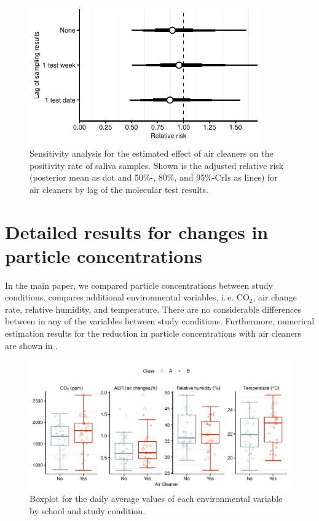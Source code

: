 \documentclass[fleqn,11pt]{wlscirep_supp}
\newcommand\ie{i.\,e.\xspace}
\begin{document}
\begin{figure}[!htb]
\centering
    \includegraphics[width=10cm]{../../results/mol-data/model-results.pdf}
    \caption[Sensitivity analysis for the estimated effect of air cleaners on the positivity rate of saliva samples]{Sensitivity analysis for the estimated effect of air cleaners on the positivity rate of saliva samples. Shown is the adjusted relative risk (posterior mean as dot and 50\%-, 80\%, and 95\%-CrIs as lines) for air cleaners by lag of the molecular test results.}
    \label{fig:mol-estimation-results-sensitivity}
\end{figure}

\clearpage

\section{Detailed results for changes in particle concentrations}\label{sec:detailed-palas}

In the main paper, we compared particle concentrations between study conditions.  compares additional environmental variables, \ie CO$_2$, air change rate, relative humidity, and temperature. There are no considerable differences between in any of the variables between study conditions. Furthermore, numerical estimation results for the reduction in particle concentrations with air cleaners are shown in .

\begin{figure}[!htb]
\centering
    \includegraphics[width=\linewidth]{../../results/env-data/otherVars-boxplot.pdf}
    \caption[Boxplot of environmental variables by school and study condition]{Boxplot for the daily average values of each environmental variable by school and study condition.}
    \label{fig:env-descriptives-other-vars}
\end{figure}
\end{document}
